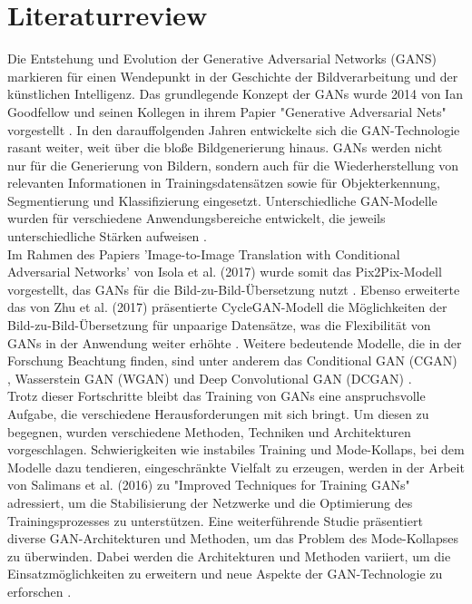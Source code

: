 \chapter{Literaturreview}

Die Entstehung und Evolution der Generative Adversarial Networks (GANS) markieren für einen Wendepunkt in der Geschichte der Bildverarbeitung und der künstlichen Intelligenz. Das grundlegende Konzept der GANs wurde 2014 von Ian Goodfellow und seinen Kollegen in ihrem Papier "Generative Adversarial Nets" vorgestellt \cite{IanJ.GoodfellowJeanPougetAbadieMehdiMirzaBingXuDavidWardeFarleySherjilOzairAaro.2014}.\newline
In den darauffolgenden Jahren entwickelte sich die GAN-Technologie rasant weiter, weit über die bloße Bildgenerierung hinaus. GANs werden nicht nur für die Generierung von Bildern, sondern auch für die Wiederherstellung von relevanten Informationen in Trainingsdatensätzen sowie für Objekterkennung, Segmentierung und Klassifizierung eingesetzt. Unterschiedliche GAN-Modelle wurden für verschiedene Anwendungsbereiche entwickelt, die jeweils unterschiedliche Stärken aufweisen \cite{Aggarwal.2021}.
\\\newline
Im Rahmen des Papiers 'Image-to-Image Translation with Conditional Adversarial Networks' von Isola et al. (2017) wurde somit das Pix2Pix-Modell vorgestellt, das GANs für die Bild-zu-Bild-Übersetzung nutzt \cite{PhillipIsola.}. Ebenso erweiterte das von Zhu et al. (2017) präsentierte CycleGAN-Modell die Möglichkeiten der Bild-zu-Bild-Übersetzung für unpaarige Datensätze, was die Flexibilität von GANs in der Anwendung weiter erhöhte \cite{Zhu.2017}. Weitere bedeutende Modelle, die in der Forschung Beachtung finden, sind unter anderem das Conditional GAN (CGAN) \cite{Mirza.2014}, Wasserstein GAN (WGAN) \cite{Arjovsky.2017} und Deep Convolutional GAN (DCGAN) \cite{Krizhevsky.2017}.
\\\newline
Trotz dieser Fortschritte bleibt das Training von GANs eine anspruchsvolle Aufgabe, die verschiedene Herausforderungen mit sich bringt. Um diesen zu begegnen, wurden verschiedene Methoden, Techniken und Architekturen vorgeschlagen. Schwierigkeiten wie instabiles Training und Mode-Kollaps, bei dem Modelle dazu tendieren, eingeschränkte Vielfalt zu erzeugen, werden in der Arbeit von Salimans et al. (2016) \cite{Salimans.2016} zu "Improved Techniques for Training GANs" adressiert, um die Stabilisierung der Netzwerke und die Optimierung des Trainingsprozesses zu unterstützen.
Eine weiterführende Studie \cite{Hong.2020} präsentiert diverse GAN-Architekturen und Methoden, um das Problem des Mode-Kollapses zu überwinden. Dabei werden die Architekturen und Methoden variiert, um die Einsatzmöglichkeiten zu erweitern \cite{Jain.2020, Eckerli.2021, Sharma.2022} und neue Aspekte der GAN-Technologie zu erforschen \cite{Srivastava.2017}.
\\\newline

